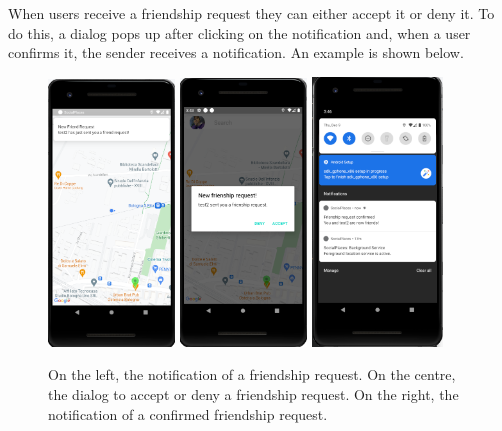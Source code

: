 \documentclass[../../main]{subfiles}
\begin{document}
\noindent
When users receive a friendship request they can either accept it or deny it. To do this, a dialog pops up after clicking on the notification and, when a user confirms it, the sender receives a notification.
An example is shown below.
\begin{figure}[H]
    \centering
    \includegraphics[width=0.3\textwidth]{images/app/notification/friend/friend_request_notification.png}
    \includegraphics[width=0.3\textwidth]{images/app/notification/friend/dialog_friend_request.png}
    \includegraphics[width=0.31\textwidth]{images/app/notification/friend/confirmed_request.png}
    \caption{On the left, the notification of a friendship request. On the centre, the dialog to accept or deny a friendship request. On the right, the notification of a confirmed friendship request.}
\end{figure}
\end{document}
